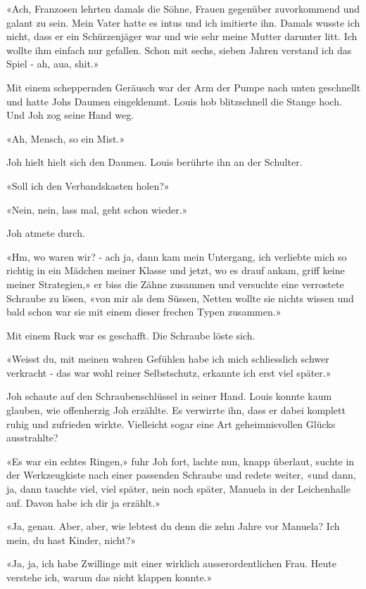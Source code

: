 «Ach, Franzosen lehrten damals die Söhne, Frauen gegenüber zuvorkommend
und galant zu sein. Mein Vater hatte es intus und ich imitierte ihn.
Damals wusste ich nicht, dass er ein Schürzenjäger war und wie sehr
meine Mutter darunter litt. Ich wollte ihm einfach nur gefallen. Schon
mit sechs, sieben Jahren verstand ich das Spiel - ah, aua, shit.»

Mit einem scheppernden Geräusch war der Arm der Pumpe nach unten
geschnellt und hatte Johs Daumen eingeklemmt. Louis hob blitzschnell die
Stange hoch. Und Joh zog seine Hand weg.

«Ah, Mensch, so ein Mist.»

Joh hielt hielt sich den Daumen. Louis berührte ihn an der Schulter.

«Soll ich den Verbandskasten holen?»

«Nein, nein, lass mal, geht schon wieder.»

Joh atmete durch. 

«Hm, wo waren wir? - ach ja, dann kam mein Untergang, ich verliebte mich so
richtig in ein Mädchen meiner Klasse und jetzt, wo es drauf ankam, griff
keine meiner Strategien,» er biss die Zähne zusammen und versuchte eine
verrostete Schraube zu lösen, «von mir als dem Süssen, Netten wollte sie
nichts wissen und bald schon war sie mit einem dieser frechen Typen
zusammen.»

Mit einem Ruck war es geschafft. Die Schraube löste sich. 

«Weisst du, mit meinen wahren Gefühlen habe ich mich schliesslich 
schwer verkracht - das war wohl reiner Selbstschutz, erkannte ich erst viel später.»

Joh schaute auf den Schraubenschlüssel in seiner Hand.
Louis konnte kaum glauben, wie offenherzig Joh erzählte. Es verwirrte ihn, dass er dabei komplett ruhig und zufrieden wirkte. Vielleicht sogar eine Art geheimnisvollen Glücks ausstrahlte?

«Es war ein echtes Ringen,» fuhr Joh fort, lachte nun, knapp überlaut, suchte in
der Werkzeugkiste nach einer passenden Schraube und redete weiter, «und
dann, ja, dann tauchte viel, viel später, nein noch später, Manuela in
der Leichenhalle auf. Davon habe ich dir ja erzählt.»

«Ja, genau. Aber, aber, wie lebtest du denn die zehn Jahre vor Manuela? Ich mein, du hast
Kinder, nicht?»

«Ja, ja, ich habe Zwillinge mit einer wirklich ausserordentlichen Frau.
Heute verstehe ich, warum das nicht klappen konnte.»

